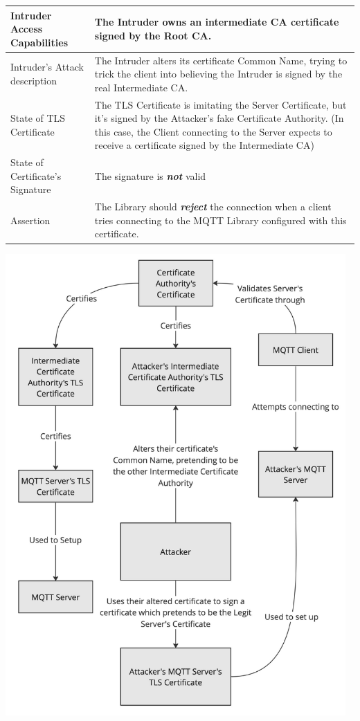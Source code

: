 \documentclass[binding=0.6cm,noexaminfo]{sapthesis}
\begin{document}
\begin{center}
\begin{tabular}{| p{6cm} | p{6cm} |}
\hline
Intruder Access Capabilities & The Intruder owns an intermediate CA certificate signed by the Root CA. \\
\hline
Intruder’s Attack description & The Intruder alters its certificate Common Name, trying to trick the client into believing the Intruder is signed by the real Intermediate CA. \\
\hline
State of TLS Certificate & The TLS Certificate is imitating the Server Certificate, but it’s signed by the Attacker’s fake Certificate Authority. (In this case, the Client connecting to the Server expects to receive a certificate signed by the Intermediate CA) \\
\hline
State of Certificate’s Signature & The signature is \textbf{\textit{not}} valid \\
\hline
Assertion & The Library should \textbf{\textit{reject}} the connection when a client tries connecting to the MQTT Library configured with this certificate. \\
\hline
\end{tabular}
\end{center}

\includegraphics[width=13cm]{TC10}
\end{document}
